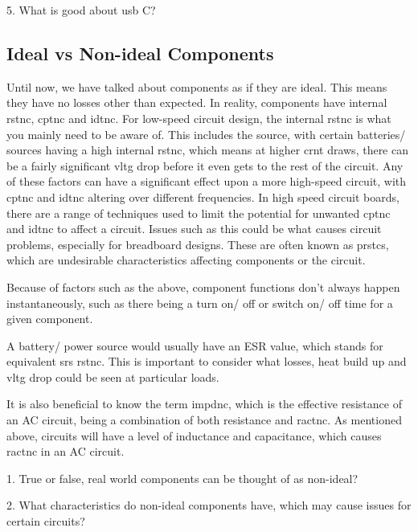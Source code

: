 \documentclass[a4paper,11pt]{report}
\newcommand{\Quiz}[1] %
{
\par\noindent %
\phantomsection %
\todo[inline, color=blue!30]{\textbf{#1}} %
\vspace{1em} %
}
\begin{document}
5. What is good about \gls{usb} C?

\vspace*{1\baselineskip}

\subsection{Ideal vs Non-ideal Components}

Until now, we have talked about components as if they are ideal. This means they have no losses other than expected. In reality, components have internal \gls{rstnc}, \gls{cptnc} and \gls{idtnc}. For low-speed circuit design, the internal \gls{rstnc} is what you mainly need to be aware of. This includes the source, with certain batteries/ sources having a high internal \gls{rstnc}, which means at higher \gls{crnt} draws, there can be a fairly significant \gls{vltg} drop before it even gets to the rest of the circuit. Any of these factors can have a significant effect upon a more high-speed circuit, with \gls{cptnc} and \gls{idtnc} altering over different frequencies. In high speed circuit boards, there are a range of techniques used to limit the potential for unwanted \gls{cptnc} and \gls{idtnc} to affect a circuit. Issues such as this could be what causes circuit problems, especially for breadboard designs. These are often known as \gls{prstcs}, which are undesirable characteristics affecting components or the circuit.

Because of factors such as the above, component functions don't always happen instantaneously, such as there being a turn on/ off or switch on/ off time for a given component.

A battery/ power source would usually have an ESR value, which stands for equivalent \gls{srs} \gls{rstnc}. This is important to consider what losses, heat build up and \gls{vltg} drop could be seen at particular loads.

It is also beneficial to know the term \gls{impdnc}, which is the effective resistance of an AC circuit, being a combination of both resistance and \gls{ractnc}. As mentioned above, circuits will have a level of inductance and capacitance, which causes \gls{ractnc} in an AC circuit.

\Quiz{Quiz}

1. True or false, real world components can be thought of as non-ideal?

2. What characteristics do non-ideal components have, which may cause issues for certain circuits?
\end{document}
